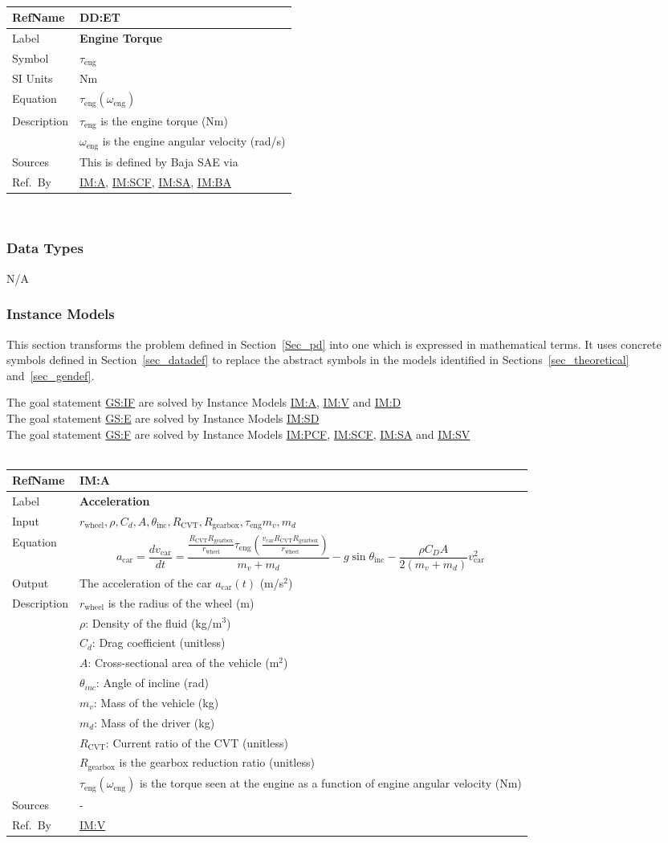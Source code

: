 \documentclass[12pt]{article}
\newcommand{\colAwidth}{0.13\textwidth}
\newcommand{\colBwidth}{0.82\textwidth}
\newcommand{\hpref}[1]{\hyperref[#1]{#1}}
\newcommand{\definstance}[8] {
~\newline
\noindent
\begin{minipage}{\textwidth}
\renewcommand*{\arraystretch}{1.5}
\begin{tabular}{| p{\colAwidth} | p{\colBwidth}|}
  \hline
  \rowcolor[gray]{0.9}
  RefName& \textbf{#1} \label{#1}\\
  \hline
  Label& \bf #2 \\
  \hline
  Input& #3\\
  \hline
  Equation& #4\\
  \hline
  Output& #5\\
  \hline
  Description& #6 \\
  \hline
  Sources& #7 \\
  \hline
  Ref.\ By & #8\\
  \hline
\end{tabular}
\end{minipage}\\
}
\newcommand{\defdata}[8] {
~\newline
\noindent
\begin{minipage}{\textwidth}
\renewcommand*{\arraystretch}{1.5}
\begin{tabular}{| p{\colAwidth} | p{\colBwidth}|}
\hline
\rowcolor[gray]{0.9}
RefName& \textbf{#1} \label{#1}\\
\hline
Label& \bf #2\\
\hline
Symbol & #3\\
\hline
SI Units & #4\\
\hline
Equation& #5\\
\hline
Description & #6\\
\hline
Sources& #7 \\
\hline
Ref.\ By & #8\\
\hline
\end{tabular}
\end{minipage}\\
}
\begin{document}
\defdata 
{DD:ET}
{Engine Torque}
{$\tau_\text{eng}$}
{Nm}
{$\tau_\text{eng}(\omega_\text{eng})$}
{
  $\tau_\text{eng}$ is the engine torque (Nm)\\
  & $\omega_\text{eng}$ is the engine angular velocity (rad/s)
}
{This is defined by Baja SAE via \citet{BajaSAEKohlerEngine2022}}%
{\hpref{IM:A}, \hpref{IM:SCF}, \hpref{IM:SA}, \hpref{IM:BA}}%

\subsubsection{Data Types}\label{sec_datatypes}

N/A

\subsubsection{Instance Models} \label{sec_instance}    

This section transforms the problem defined in Section~\ref{Sec_pd} into 
one which is expressed in mathematical terms. It uses concrete symbols defined 
in Section~\ref{sec_datadef} to replace the abstract symbols in the models 
identified in Sections~\ref{sec_theoretical} and~\ref{sec_gendef}.
{\newline}

{\noindent}The goal statement \hpref{GS:IF} are solved by Instance Models \hpref{IM:A}, \hpref{IM:V} and \hpref{IM:D}\\
{\noindent}The goal statement \hpref{GS:E} are solved by Instance Models \hpref{IM:SD}\\
The goal statement \hpref{GS:F} are solved by Instance Models \hpref{IM:PCF}, \hpref{IM:SCF}, \hpref{IM:SA} and \hpref{IM:SV}\\
  \definstance
  {IM:A}
  {Acceleration}
  {$r_{\text{wheel}}, \rho, C_d, A, \theta_{\text{inc}}, R_{\text{CVT}}, R_\text{gearbox}, \tau_\text{eng} m_v, m_d$}
  {
    \[a_\text{car} = \frac{dv_\text{car}}{dt} = \frac{\frac{R_{\text{CVT}} R_\text{gearbox}}{r_\text{wheel}} \tau_\text{eng}(\frac{v_\text{car} R_{\text{CVT}} R_\text{gearbox}}{r_\text{wheel}})}{m_v + m_d} - g\sin{\theta_\text{inc}} - \frac{\rho C_D A}{2(m_v + m_d)} v_\text{car}^2 \]
  }
  {The acceleration of the car $a_\text{car}(t)$ (m/s$^2$)}
  {
  $r_{\text{wheel}}$ is the radius of the wheel (m)\\
  & $\rho$: Density of the fluid (kg/m$^3$)\\
  & $C_d$: Drag coefficient (unitless)\\
  & $A$: Cross-sectional area of the vehicle (m$^2$)\\
  & $\theta_{inc}$: Angle of incline (rad)\\
  & $m_v$: Mass of the vehicle (kg)\\
  & $m_d$: Mass of the driver (kg)\\
  & $R_{\text{CVT}}$: Current ratio of the CVT (unitless)\\
  & $R_\text{gearbox}$ is the gearbox reduction ratio (unitless)\\
  & $\tau_{\text{eng}}(\omega_\text{eng})$ is the torque seen at the engine as a function of engine angular velocity (Nm)
}
{-}
{\hpref{IM:V}}
  
\end{document}
